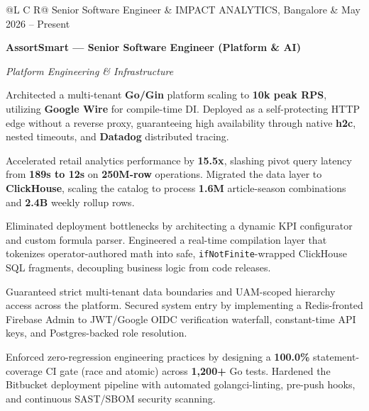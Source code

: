 
\noindent
\begin{tabularx}{\textwidth}{@{}L C R@{}}
\textcolor{role}{Senior Software Engineer} & \textcolor{company}{IMPACT ANALYTICS, Bangalore} & \textcolor{date}{May 2026 -- Present}\\
\end{tabularx}
\vspace{-1.6ex}

\textcolor{Project}{\textbf{AssortSmart --- Senior Software Engineer (Platform \& AI)}}
\vspace{0.2ex}

\textcolor{Project}{\textit{Platform Engineering \& Infrastructure}}
\vspace{-0.8ex}
\begin{zitemize}
    \item Architected a multi-tenant \textbf{Go/Gin} platform scaling to \textbf{10k peak RPS}, utilizing \textbf{Google Wire} for compile-time DI. Deployed as a self-protecting HTTP edge without a reverse proxy, guaranteeing high availability through native \textbf{h2c}, nested timeouts, and \textbf{Datadog} distributed tracing.
    \item Accelerated retail analytics performance by \textbf{15.5x}, slashing pivot query latency from \textbf{189s to 12s} on \textbf{250M-row} operations. Migrated the data layer to \textbf{ClickHouse}, scaling the catalog to process \textbf{1.6M} article-season combinations and \textbf{2.4B} weekly rollup rows.
    \item Eliminated deployment bottlenecks by architecting a dynamic KPI configurator and custom formula parser. Engineered a real-time compilation layer that tokenizes operator-authored math into safe, \texttt{ifNotFinite}-wrapped ClickHouse SQL fragments, decoupling business logic from code releases.
    \item Guaranteed strict multi-tenant data boundaries and UAM-scoped hierarchy access across the platform. Secured system entry by implementing a Redis-fronted Firebase Admin to JWT/Google OIDC verification waterfall, constant-time API keys, and Postgres-backed role resolution.
    \item Enforced zero-regression engineering practices by designing a \textbf{100.0\%} statement-coverage CI gate (race and atomic) across \textbf{1,200+} Go tests. Hardened the Bitbucket deployment pipeline with automated golangci-linting, pre-push hooks, and continuous SAST/SBOM security scanning.
\end{zitemize}

